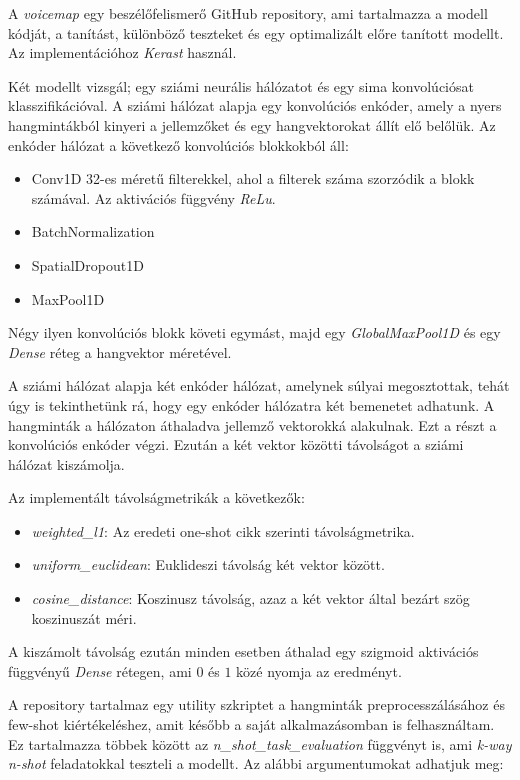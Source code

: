 A \emph{voicemap} egy beszélőfelismerő GitHub repository, ami tartalmazza a modell kódját, a tanítást, különböző teszteket és egy optimalizált előre tanított modellt. Az implementációhoz \emph{Kerast} használ.

Két modellt vizsgál; egy sziámi neurális hálózatot és egy sima konvolúciósat klasszifikációval. A sziámi hálózat alapja egy konvolúciós enkóder, amely a nyers hangmintákból kinyeri a jellemzőket és egy hangvektorokat állít elő belőlük. Az enkóder hálózat a következő konvolúciós blokkokból áll:

\begin{itemize}
	\item Conv1D 32-es méretű filterekkel, ahol a filterek száma szorzódik a blokk számával. Az aktivációs függvény \emph{ReLu}.
	\item BatchNormalization
	\item SpatialDropout1D
	\item MaxPool1D
\end{itemize}

Négy ilyen konvolúciós blokk követi egymást, majd egy \emph{GlobalMaxPool1D} és egy \emph{Dense} réteg a hangvektor méretével.

A sziámi hálózat alapja két enkóder hálózat, amelynek súlyai megosztottak, tehát úgy is tekinthetünk rá, hogy egy enkóder hálózatra két bemenetet adhatunk. A hangminták a hálózaton áthaladva jellemző vektorokká alakulnak. Ezt a részt a konvolúciós enkóder végzi. Ezután a két vektor közötti távolságot a sziámi hálózat kiszámolja.

Az implementált távolságmetrikák a következők:

\begin{itemize}
	\item \emph{weighted\_l1}: Az eredeti one-shot cikk szerinti távolságmetrika.
	\item \emph{uniform\_euclidean}: Euklideszi távolság két vektor között.
	\item \emph{cosine\_distance}: Koszinusz távolság, azaz a két vektor által bezárt szög koszinuszát méri.
\end{itemize}

A kiszámolt távolság ezután minden esetben áthalad egy szigmoid aktivációs függvényű \emph{Dense} rétegen, ami $0$ és $1$ közé nyomja az eredményt.

A repository tartalmaz egy utility szkriptet a hangminták preprocesszálásához és few-shot kiértékeléshez, amit később a saját alkalmazásomban is felhasználtam. Ez tartalmazza többek között az \emph{n\_shot\_task\_evaluation} függvényt is, ami \emph{k-way n-shot} feladatokkal teszteli a modellt. Az alábbi argumentumokat adhatjuk meg:

